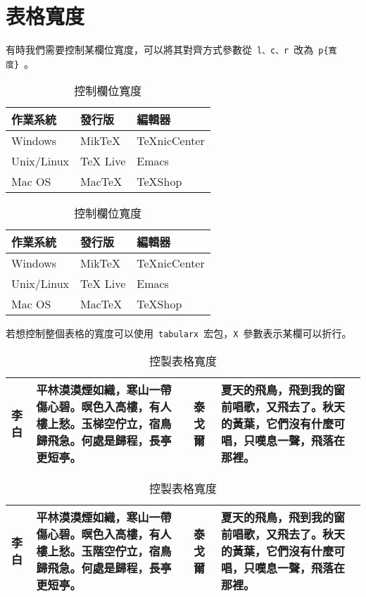 \section{表格寬度}
有時我們需要控制某欄位寬度，可以將其對齊方式參數從~\verb|l、c、r|~改為~\verb|p{寬度}|~。
\begin{code}
\begin{table}[htbp]
\caption{控制欄位寬度}
\centering
\begin{tabular}{p{100pt}p{100pt}p{100pt}}
    \toprule
    作業系統 & 發行版 & 編輯器 \\
    \midrule
    Windows & MikTeX & TeXnicCenter \\
    Unix/Linux & TeX Live & Emacs \\
    Mac OS & MacTeX & TeXShop \\
    \bottomrule
\end{tabular}
\end{table}
\end{code}

\begin{table}[htbp]
\caption{控制欄位寬度}
\centering
\begin{tabular}{p{100pt}p{100pt}p{100pt}}
    \toprule
    作業系統 & 發行版 & 編輯器 \\
    \midrule
    Windows & MikTeX & TeXnicCenter \\
    Unix/Linux & TeX Live & Emacs \\
    Mac OS & MacTeX & TeXShop \\
    \bottomrule
\end{tabular}
\end{table}

若想控制整個表格的寬度可以使用~\verb|tabularx|~宏包，\verb|X|~參數表示某欄可以折行。

\begin{code}
\begin{table}[htbp]
\caption{控製表格寬度}
\centering
\begin{tabularx}{350pt}{lXlX}
    \toprule
    李白 & 平林漠漠煙如織，寒山一帶傷心碧。暝色入高樓，有人樓上愁。玉梯空佇立，宿鳥歸飛急。何處是歸程，長亭更短亭。& 
    泰戈爾 & 夏天的飛鳥，飛到我的窗前唱歌，又飛去了。秋天的黃葉，它們沒有什麼可唱，只嘆息一聲，飛落在那裡。\\
    \bottomrule
\end{tabularx}
\end{table}
\end{code}

\begin{table}[htbp]
\caption{控製表格寬度}
\centering
\begin{tabularx}{350pt}{lXlX}
    \toprule
    李白 & 平林漠漠煙如織，寒山一帶傷心碧。暝色入高樓，有人樓上愁。玉階空佇立，宿鳥歸飛急。何處是歸程，長亭更短亭。& 
    泰戈爾 & 夏天的飛鳥，飛到我的窗前唱歌，又飛去了。秋天的黃葉，它們沒有什麼可唱，只嘆息一聲，飛落在那裡。\\
    \bottomrule
\end{tabularx}
\end{table}


